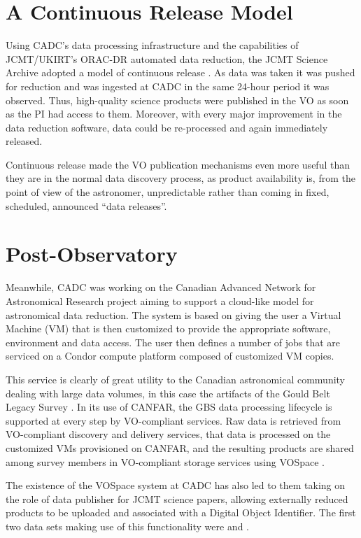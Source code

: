 \documentclass[final,authoryear,5p,times,twocolumn]{elsarticle}
\begin{document}
\section{A Continuous Release Model}

Using CADC's data processing infrastructure and the capabilities of
JCMT/UKIRT's ORAC-DR automated data reduction, the JCMT Science
Archive adopted a model of continuous release
\citep{2011ASPC..442..203E}. As data was taken it was pushed for
reduction and was ingested at CADC in the same 24-hour period it was
observed. Thus, high-quality science products were published in the VO
as soon as the PI had access to them. Moreover, with every major
improvement in the data reduction software, data could be re-processed
and again immediately released.

Continuous release made the VO publication mechanisms even more useful
than they are in the normal data discovery process, as product
availability is, from the point of view of the astronomer,
unpredictable rather than coming in fixed, scheduled, announced ``data
releases''.

\section{Post-Observatory}

Meanwhile, CADC was working on the Canadian Advanced Network for
Astronomical Research \citep[CANFAR;][]{2010SPIE.7740E..51G} project aiming to
support a cloud-like model for astronomical data reduction. The system
is based on giving the user a Virtual Machine (VM) that is then customized to
provide the appropriate software, environment and data access. The
user then defines a number of jobs that are serviced on a Condor
compute platform composed of customized VM copies.

This service is clearly of great utility to the Canadian astronomical
community dealing with large data volumes, in this case the artifacts of
the Gould Belt Legacy Survey \citep[GBS;][]{2007PASP..119..855W}.
In its use of CANFAR, the GBS data
processing lifecycle is supported at every step by VO-compliant services.
Raw data is retrieved from VO-compliant discovery and delivery services,
that data is processed on the customized VMs provisioned on CANFAR, and
the resulting products are shared among survey members in VO-compliant
storage services using VOSpace \citep{vospace}.

The existence of the VOSpace system at CADC has also led to them
taking on the role of data publisher for JCMT science papers, allowing
externally reduced products to be uploaded and associated with a
Digital Object Identifier. The first two data sets making use of this
functionality were \citet{2012MNRAS.424.3050W} and
\citet{2013ApJS..209....8D}.
\end{document}
